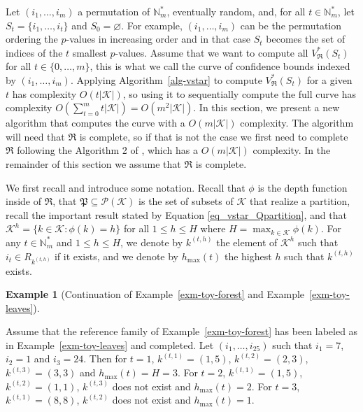 \documentclass[
  11pt,
  a4paper,
]{article}
\theoremstyle{definition}
\newtheorem{example}{Example}[section]
\theoremstyle{plain}
\theoremstyle{plain}
\theoremstyle{plain}
\theoremstyle{definition}
\theoremstyle{remark}
\begin{document}
Let \((i_1,\dotsc, i_m)\) a permutation of \(\mathbb{N}_m^*\),
eventually random, and, for all \(t\in\mathbb{N}_m^*\), let
\(S_t=\{i_1,\dotsc,i_t\}\) and \(S_0=\varnothing\). For example,
\((i_1,\dotsc, i_m)\) can be the permutation ordering the \(p\)-values
in increasing order and in that case \(S_t\) becomes the set of indices
of the \(t\) smallest \(p\)-values. Assume that we want to compute all
\(V^*_{\mathfrak{R}}(S_t)\) for all \(t\in\{ 0,\dotsc,m\}\), this is
what we call the curve of confidence bounds indexed by
\((i_1,\dotsc, i_m)\). Applying  Algorithm~\ref{alg-vstar}  to compute
\(V^*_{\mathfrak{R}}(S_t)\) for a given \(t\) has complexity
\(O(t|\mathcal{K}|)\), so using it to sequentially compute the full
curve has complexity
\(O\left(\sum_{t=0}^m t |\mathcal{K}|\right)=O\left(m^2|\mathcal{K}|\right)\).
In this section, we present a new algorithm that computes the curve with
a \(O\left(m|\mathcal{K}|\right)\) complexity. The algorithm will need
that \(\mathfrak{R}\) is complete, so if that is not the case we first
need to complete \(\mathfrak{R}\) following the Algorithm 2 of
\citet{MR4178188}, which has a \(O(m|\mathcal{K}|)\) complexity. In the
remainder of this section we assume that \(\mathfrak{R}\) is complete.

We first recall and introduce some notation. Recall that \(\phi\) is the
depth function inside of \(\mathfrak{R}\), that
\(\mathfrak P \subseteq \mathcal P(\mathcal{K})\) is the set of subsets
of \(\mathcal{K}\) that realize a partition, recall the important result
stated by Equation \eqref{eq_vstar_Qpartition}, and that
\(\mathcal{K}^h=\{ k\in\mathcal{K}: \phi(k)=h  \}\) for all
\(1\leq h\leq H\) where \(H=\max_{k\in\mathcal{K}}\phi(k)\). For any
\(t\in\mathbb{N}_m^*\) and \(1\leq h\leq H\), we denote by \(k^{(t,h)}\)
the element of \(\mathcal{K}^h\) such that \(i_t\in R_{k^{(t,h)}}\) if
it exists, and we denote by \(h_{\max}(t)\) the highest \(h\) such that
\(k^{(t,h)}\) exists.

\begin{example}[Continuation of Example~\ref{exm-toy-forest} and
Example~\ref{exm-toy-leaves}]\protect\hypertarget{exm-kth}{}\label{exm-kth}

Assume that the reference family of Example~\ref{exm-toy-forest} has
been labeled as in Example~\ref{exm-toy-leaves} and completed. Let
\((i_1,\dotsc, i_{25})\) such that \(i_1=7\), \(i_2=1\) and \(i_3=24\).
Then for \(t=1\), \(k^{(t,1)}=(1,5)\), \(k^{(t,2)}=(2,3)\),
\(k^{(t,3)}=(3,3)\) and \(h_{\max}(t)=H=3\). For \(t=2\),
\(k^{(t,1)}=(1,5)\), \(k^{(t,2)}=(1,1)\), \(k^{(t,3)}\) does not exist
and \(h_{\max}(t)=2\). For \(t=3\), \(k^{(t,1)}=(8,8)\), \(k^{(t,2)}\)
does not exist and \(h_{\max}(t)=1\).

\end{example}
\end{document}
